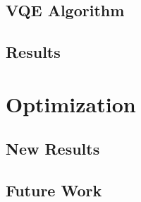 \documentclass[9pt, handout, aspectratio=169]{beamer}		%
\begin{document}

	\subsection{VQE Algorithm}
	

	\subsection{Results}
	

\section{Optimization}


	\subsection{New Results}
	

	\subsection{Future Work}
	
	
\end{document}
